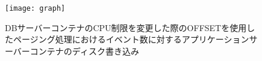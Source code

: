 \documentclass[../../../../../main]{subfiles}
\begin{document}
    \begin{figure}[H]
        \centering
        \texttt{[image: graph]}
        \caption{DBサーバーコンテナのCPU制限を変更した際のOFFSETを使用したページング処理におけるイベント数に対するアプリケーションサーバーコンテナのディスク書き込み}
        \label{fig:paging-offset-change-db-cpu-limit-app-disk-in-app_4_8192-db_1024}
    \end{figure}
\end{document}
